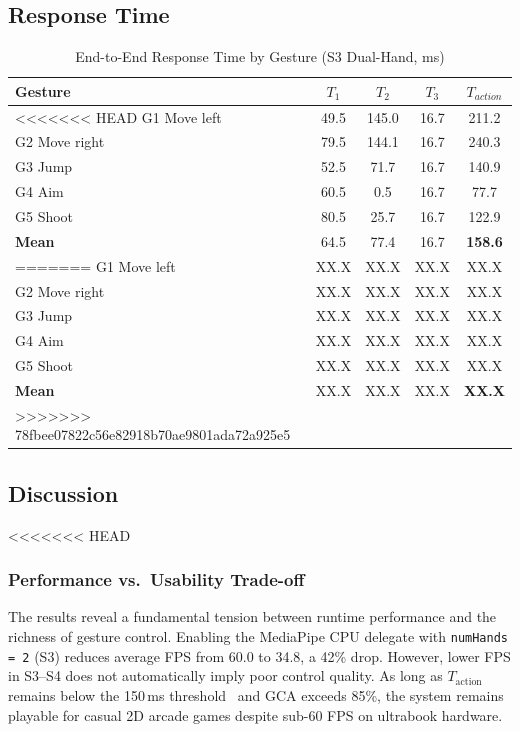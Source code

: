 \documentclass[journal,onecolumn,12pt,draftclsnofoot]{IEEEtran}
\begin{document}
\begin{itemize}
\subsection{Response Time}
\begin{table}[htbp]
\caption{End-to-End Response Time by Gesture (S3 Dual-Hand, ms)}
\centering
\begin{tabular}{|l|c|c|c|c|}
\hline
\textbf{Gesture} & \textbf{$T_1$} & \textbf{$T_2$} & \textbf{$T_3$} & \textbf{$T_{action}$} \\
\hline
<<<<<<< HEAD
G1 Move left   & 49.5 & 145.0 & 16.7 & 211.2 \\
G2 Move right  & 79.5 & 144.1 & 16.7 & 240.3 \\
G3 Jump        & 52.5 & 71.7  & 16.7 & 140.9 \\
G4 Aim         & 60.5 & 0.5   & 16.7 & 77.7  \\
G5 Shoot       & 80.5 & 25.7  & 16.7 & 122.9 \\
\hline
\textbf{Mean}  & 64.5 & 77.4  & 16.7 & \textbf{158.6} \\
=======
G1 Move left   & XX.X & XX.X & XX.X & XX.X \\
G2 Move right  & XX.X & XX.X & XX.X & XX.X \\
G3 Jump        & XX.X & XX.X & XX.X & XX.X \\
G4 Aim         & XX.X & XX.X & XX.X & XX.X \\
G5 Shoot       & XX.X & XX.X & XX.X & XX.X \\
\hline
\textbf{Mean}  & XX.X & XX.X & XX.X & \textbf{XX.X} \\
>>>>>>> 78fbee07822c56e82918b70ae9801ada72a925e5
\hline
\end{tabular}
\label{tab:response}
\end{table}

\subsection{Discussion}
<<<<<<< HEAD

\subsubsection{Performance vs.\ Usability Trade-off}
The results reveal a fundamental tension between runtime performance and the richness of gesture control. Enabling the MediaPipe CPU delegate with \texttt{numHands = 2} (S3) reduces average FPS from 60.0 to 34.8, a 42\% drop. However, lower FPS in S3--S4 does not automatically imply poor control quality. As long as $T_{\text{action}}$ remains below the 150\,ms threshold~\cite{b4} and GCA exceeds 85\%, the system remains playable for casual 2D arcade games despite sub-60 FPS on ultrabook hardware.


\end{itemize}
\end{document}
